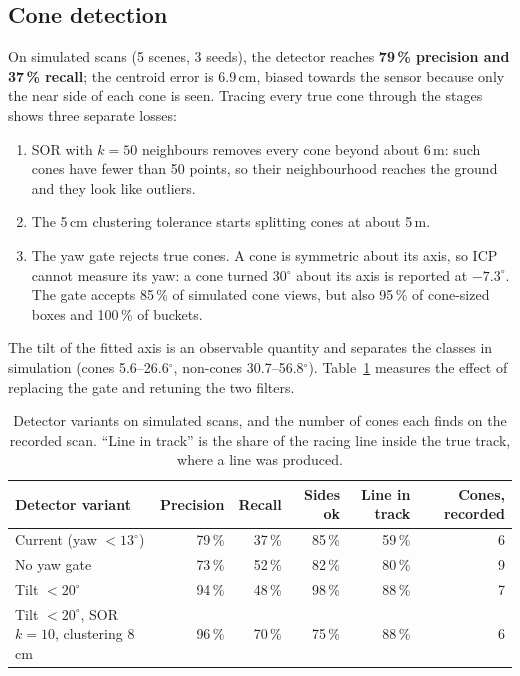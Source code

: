 \documentclass[10pt,a4paper]{scrartcl}
\renewcommand{\emph}[1]{\textcolor{accent}{#1}}
\begin{document}
  \subsection{Cone detection}
  \label{sec:detection}

  On simulated scans (5 scenes, 3 seeds), the detector reaches \textbf{79\,\% precision and
  37\,\% recall}; the centroid error is 6.9\,cm, biased towards the sensor because only the
  near side of each cone is seen. Tracing every true cone through the stages shows three
  separate losses:
  \begin{enumerate}
    \item SOR with $k=50$ neighbours removes every cone beyond about 6\,m: such cones have fewer
      than 50 points, so their neighbourhood reaches the ground and they look like outliers.
    \item The 5\,cm clustering tolerance starts splitting cones at about 5\,m.
    \item The yaw gate rejects true cones. A cone is symmetric about its axis, so ICP cannot
      measure its yaw: a cone turned 30$^\circ$ about its axis is reported at $-7.3^\circ$. The
      gate accepts 85\,\% of simulated cone views, but also 95\,\% of cone-sized boxes and 100\,\%
      of buckets.
  \end{enumerate}

  The \emph{tilt} of the fitted axis is an observable quantity and separates the classes in
  simulation (cones 5.6--26.6$^\circ$, non-cones 30.7--56.8$^\circ$). Table~\ref{tab:variants}
  measures the effect of replacing the gate and retuning the two filters.

  \begin{table}[htbp]
  \small
  \centering
  \begin{tabular}{@{}lrrrrr@{}}
  \toprule
  \textbf{Detector variant} & \textbf{Precision} & \textbf{Recall} & \textbf{Sides ok} & \textbf{Line in track} & \textbf{Cones, recorded} \\
  \midrule
  Current (yaw $<13^\circ$) & 79\,\% & 37\,\% & 85\,\% & 59\,\% & 6 \\
  No yaw gate & 73\,\% & 52\,\% & 82\,\% & 80\,\% & 9 \\
  Tilt $<20^\circ$ & 94\,\% & 48\,\% & 98\,\% & 88\,\% & 7 \\
  Tilt $<20^\circ$, SOR $k=10$, clustering 8\,cm & 96\,\% & 70\,\% & 75\,\% & 88\,\% & 6 \\
  \bottomrule
  \end{tabular}
  \caption{Detector variants on simulated scans, and the number of cones each finds on the
  recorded scan. ``Line in track'' is the share of the racing line inside the true track,
  where a line was produced.}
  \label{tab:variants}
  \end{table}
\end{document}
